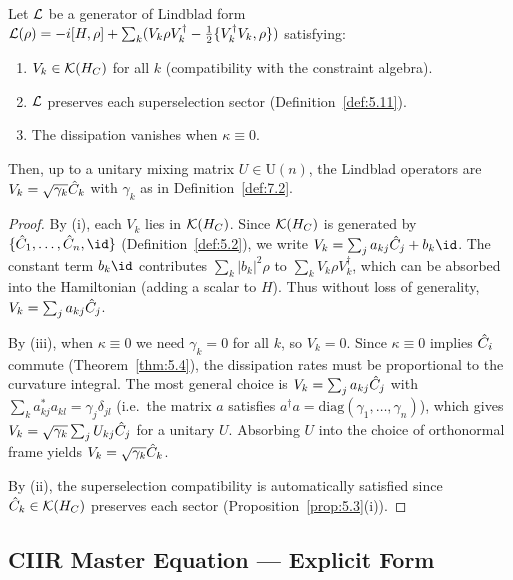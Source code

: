 \begin{lemma}
\label{lem:7.5}
Let $\mathcal{L}$ be a generator of Lindblad form
$\mathcal{L}(\rho) = -i[H, \rho] + \sum_k (V_k\rho V_k^\dagger -
\frac{1}{2}\{V_k^\dagger V_k, \rho\})$ satisfying:
\begin{enumerate}
  \item[\textup{(i)}] $V_k \in \mathcal{K}(H_C)$ for all $k$
    \textup{(}compatibility with the constraint algebra\textup{)}.
  \item[\textup{(ii)}] $\mathcal{L}$ preserves each superselection sector
    \textup{(}Definition~\textup{\ref{def:5.11})}.
  \item[\textup{(iii)}] The dissipation vanishes when $\kappa \equiv 0$.
\end{enumerate}
Then, up to a unitary mixing matrix $U \in \mathrm{U}(n)$, the Lindblad
operators are $V_k = \sqrt{\gamma_k}\hat{C}_k$ with $\gamma_k$ as in
Definition~\textup{\ref{def:7.2}}.
\end{lemma}

\begin{proof}
By (i), each $V_k$ lies in $\mathcal{K}(H_C)$.  Since $\mathcal{K}(H_C)$ is generated
by $\{\hatC_1, \ldots, \hatC_n, \id\}$ (Definition~\ref{def:5.2}),
we write $V_k = \sum_j a_{kj}\hatC_j + b_k\id$.  The constant term
$b_k\id$ contributes $\sum_k |b_k|^2\rho$ to $\sum_k V_k\rho V_k^\dagger$,
which can be absorbed into the Hamiltonian (adding a scalar to $H$).
Thus without loss of generality, $V_k = \sum_j a_{kj}\hat{C}_j$.

By (iii), when $\kappa \equiv 0$ we need $\gamma_k = 0$ for all $k$, so
$V_k = 0$.  Since $\kappa \equiv 0$ implies $\hat{C}_i$ commute
(Theorem~\ref{thm:5.4}), the dissipation rates must be proportional
to the curvature integral.  The most general choice is
$V_k = \sum_j a_{kj}\hat{C}_j$ with $\sum_k a_{kj}^*a_{kl} = \gamma_j
\delta_{jl}$ (i.e.\ the matrix $a$ satisfies
$a^\dagger a = \mathrm{diag}(\gamma_1, \ldots, \gamma_n)$), which
gives $V_k = \sqrt{\gamma_k}\sum_j U_{kj}\hat{C}_j$ for a unitary
$U$.  Absorbing $U$ into the choice of orthonormal frame yields
$V_k = \sqrt{\gamma_k}\hat{C}_k$.

By (ii), the superselection compatibility is automatically satisfied
since $\hat{C}_k \in \mathcal{K}(H_C)$ preserves each sector
(Proposition~\ref{prop:5.3}(i)).
\end{proof}

\subsection{CIIR Master Equation — Explicit Form}
\label{sec:ch7:explicit}

